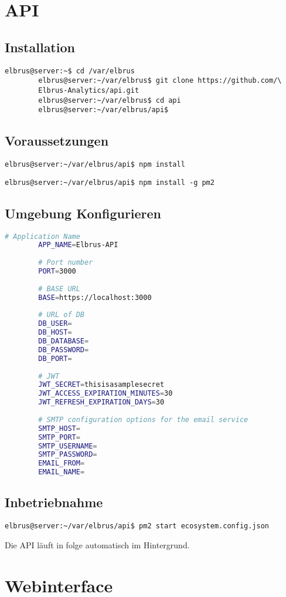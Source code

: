 \documentclass{article}
\begin{document}
	\section{API}
	\lstset{style=commands}
	\subsection{Installation}
	\begin{lstlisting}[caption={Clonen der Software von GitHub.}]
		elbrus@server:~$ cd /var/elbrus
		elbrus@server:~/var/elbrus$ git clone https://github.com/\
		Elbrus-Analytics/api.git
		elbrus@server:~/var/elbrus$ cd api
		elbrus@server:~/var/elbrus/api$
	\end{lstlisting}

	\subsection{Voraussetzungen}
	\begin{lstlisting}[caption={Nachinstallieren der Abhängigkeiten.}]
		elbrus@server:~/var/elbrus/api$ npm install
	\end{lstlisting}

	\begin{lstlisting}[caption={Installieren von 'pm2'.}]
		elbrus@server:~/var/elbrus/api$ npm install -g pm2
	\end{lstlisting}

	\newpage
	\subsection[file config]{Umgebung Konfigurieren}
	
	\lstset{style=files}
	\begin{lstlisting}[caption={Anhand von '.env.example' eigene '.env' Datei anlegen}, language=bash]
		# Application Name
		APP_NAME=Elbrus-API
		
		# Port number
		PORT=3000
		
		# BASE URL
		BASE=https://localhost:3000
		
		# URL of DB
		DB_USER=
		DB_HOST=
		DB_DATABASE=
		DB_PASSWORD=
		DB_PORT=
		
		# JWT
		JWT_SECRET=thisisasamplesecret
		JWT_ACCESS_EXPIRATION_MINUTES=30
		JWT_REFRESH_EXPIRATION_DAYS=30
		
		# SMTP configuration options for the email service
		SMTP_HOST=
		SMTP_PORT=
		SMTP_USERNAME=
		SMTP_PASSWORD=
		EMAIL_FROM=
		EMAIL_NAME=
	\end{lstlisting}

	\lstset{style=commands}
	\subsection{Inbetriebnahme}
	\begin{lstlisting}[caption={Starten der API.}]
		elbrus@server:~/var/elbrus/api$ pm2 start ecosystem.config.json
	\end{lstlisting}
	Die API läuft in folge automatisch im Hintergrund.
	\newpage
	
	\section{Webinterface}
	\newpage
\end{document}

